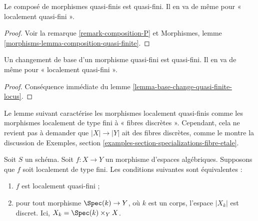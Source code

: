 \begin{lemma}
\label{lemma-composition-quasi-finite}
Le composé de morphismes quasi-finis est quasi-fini.
Il en va de même pour « localement quasi-fini ».
\end{lemma}

\begin{proof}
Voir la remarque \ref{remark-composition-P} et
Morphismes, lemme \ref{morphisms-lemma-composition-quasi-finite}.
\end{proof}

\begin{lemma}
\label{lemma-base-change-quasi-finite}
Un changement de base d'un morphisme quasi-fini est quasi-fini.
Il en va de même pour « localement quasi-fini ».
\end{lemma}

\begin{proof}
Conséquence immédiate du lemme \ref{lemma-base-change-quasi-finite-locus}.
\end{proof}

\noindent
Le lemme suivant caractérise les morphismes localement quasi-finis comme les
morphismes localement de type fini à « fibres discrètes ».
Cependant, cela ne revient pas à demander que $|X| \to |Y|$ ait
des fibres discrètes, comme le montre la discussion de
Exemples, section
\ref{examples-section-specializations-fibre-etale}.

\begin{lemma}
\label{lemma-locally-quasi-finite}
Soit $S$ un schéma. Soit $f : X \to Y$ un morphisme d'espaces algébriques.
Supposons que $f$ soit localement de type fini. Les conditions suivantes sont équivalentes :
\begin{enumerate}
\item $f$ est localement quasi-fini ;
\item pour tout morphisme $\Spec(k) \to Y$, où $k$ est un corps,
l'espace $|X_k|$ est discret. Ici, $X_k = \Spec(k) \times_Y X$.
\end{enumerate}
\end{lemma}

